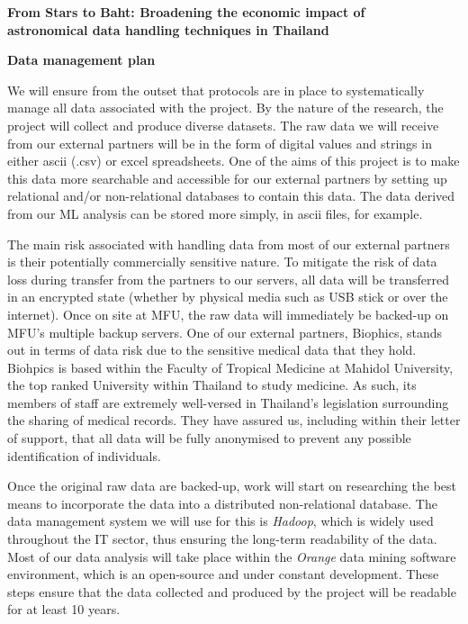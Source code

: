 \documentclass[11pt]{article}
\begin{document}
\setcounter{figure}{0}
\noindent
{\LARGE \bf From Stars to Baht: Broadening the economic impact of \\
astronomical data handling techniques in Thailand}

\vspace{3mm}
\noindent
{\LARGE \bf Data management plan}

\vspace{3mm}
\noindent
We will ensure from the outset that protocols are in place to systematically manage all data associated with the project. By the nature of the research, the project will collect and produce diverse datasets. The raw data we will receive from our external partners will be in the form of digital values and strings in either ascii (.csv) or excel spreadsheets. One of the aims of this project is to make this data more searchable and accessible for our external partners by setting up relational and/or non-relational databases to contain this data. The data derived from our ML analysis can be stored more simply, in ascii files, for example. 

\vspace{2mm}
\noindent
The main risk associated with handling data from most of our external partners is their potentially commercially sensitive nature. To mitigate the risk of data loss during transfer from the partners to our servers, all data will be transferred in an encrypted state (whether by physical media such as USB stick or over the internet). Once on site at MFU, the raw data will immediately be backed-up on MFU's multiple backup servers. One of our external partners, Biophics, stands out in terms of data risk due to the sensitive medical data that they hold. Biohpics is based within the Faculty of Tropical Medicine at Mahidol University, the top ranked University within Thailand to study medicine. As such, its members of staff are extremely well-versed in Thailand's legislation surrounding the sharing of medical records. They have assured us, including within their letter of support, that all data will be fully anonymised to prevent any possible identification of individuals. 

\vspace{2mm}
\noindent
Once the original raw data are backed-up, work will start on researching the best means to incorporate the data into a distributed non-relational database. The data management system we will use for this is {\it Hadoop}, which is widely used throughout the IT sector, thus ensuring the long-term readability of the data. Most of our data analysis will take place within the {\it Orange} data mining software environment, which is an open-source and under constant development. These steps ensure that the data collected and produced by the project will be readable for at least 10 years. 
\end{document}
